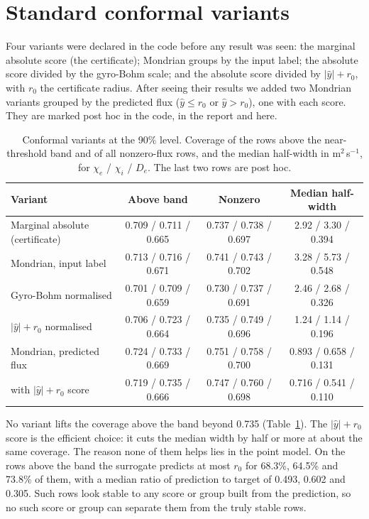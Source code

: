 \documentclass[11pt]{article}
\begin{document}
\section{Standard conformal variants}

Four variants were declared in the code before any result was seen: the
marginal absolute score (the certificate); Mondrian groups by the input label;
the absolute score divided by the gyro-Bohm scale; and the absolute score
divided by $|\hat{y}| + r_0$, with $r_0$ the certificate radius.  After seeing
their results we added two Mondrian variants grouped by the predicted flux
($\hat{y} \le r_0$ or $\hat{y} > r_0$), one with each score.  They are marked
post hoc in the code, in the report and here.

\begin{table}[ht]
\centering
\caption{Conformal variants at the 90\% level.  Coverage of the rows above the
near-threshold band and of all nonzero-flux rows, and the median half-width in
m$^2$\,s$^{-1}$, for $\chi_e$ / $\chi_i$ / $D_e$.  The last two rows are post
hoc.}
\label{tab:variants}
\small
\begin{tabular}{lccc}
\toprule
Variant & Above band & Nonzero & Median half-width \\
\midrule
Marginal absolute (certificate) & 0.709 / 0.711 / 0.665 & 0.737 / 0.738 / 0.697 & 2.92 / 3.30 / 0.394 \\
Mondrian, input label & 0.713 / 0.716 / 0.671 & 0.741 / 0.743 / 0.702 & 3.28 / 5.73 / 0.548 \\
Gyro-Bohm normalised & 0.701 / 0.709 / 0.659 & 0.730 / 0.737 / 0.691 & 2.46 / 2.68 / 0.326 \\
$|\hat{y}| + r_0$ normalised & 0.706 / 0.723 / 0.664 & 0.735 / 0.749 / 0.696 & 1.24 / 1.14 / 0.196 \\
Mondrian, predicted flux & 0.724 / 0.733 / 0.669 & 0.751 / 0.758 / 0.700 & 0.893 / 0.658 / 0.131 \\
\quad with $|\hat{y}| + r_0$ score & 0.719 / 0.735 / 0.666 & 0.747 / 0.760 / 0.698 & 0.716 / 0.541 / 0.110 \\
\bottomrule
\end{tabular}
\end{table}

No variant lifts the coverage above the band beyond 0.735
(Table~\ref{tab:variants}).  The $|\hat{y}| + r_0$ score is the efficient
choice: it cuts the median width by half or more at about the same coverage.  The reason none of
them helps lies in the point model.  On the rows above the band the surrogate
predicts at most $r_0$ for 68.3\%, 64.5\% and 73.8\% of them, with a median
ratio of prediction to target of 0.493, 0.602 and 0.305.  Such rows look
stable to any score or group built from the prediction, so no such score or
group can separate them from the truly stable rows.
\end{document}
